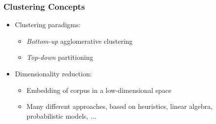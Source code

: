 \documentclass{beamer}
\begin{document}
\begin{frame}
  \frametitle{Clustering Concepts}

  \begin{itemize}
  \item Clustering paradigms:
    \begin{itemize}
    \item \emph{Bottom-up} agglomerative clustering
    \item \emph{Top-down} partitioning
    \end{itemize}
  \item Dimensionality reduction:
    \begin{itemize}
    \item Embedding of corpus in a low-dimensional space
    \item Many different approaches, based on heuristics, linear algebra, probabilistic models, ...
    \end{itemize}
  \end{itemize}

\end{frame}



\end{document}
